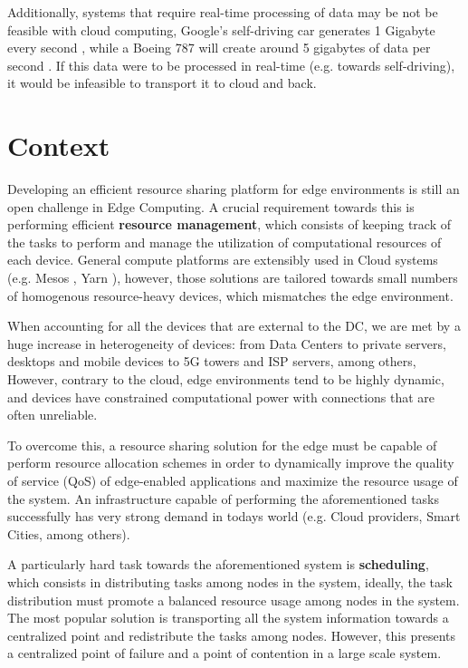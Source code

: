 Additionally, systems that require real-time processing of data may be not be feasible with cloud computing, Google's self-driving car generates 1 Gigabyte every second \cite{datafloq}, while a Boeing 787 will create around 5 gigabytes of data per second \cite{finnegan_2013}. If this data were to be processed in real-time (e.g. towards self-driving), it would be infeasible to transport it to cloud and back. 

\section{Context}

Developing an efficient resource sharing platform for edge environments is still an open challenge in Edge Computing. A crucial requirement towards this is performing efficient \textbf{resource management}, which consists of keeping track of the tasks to perform and manage the utilization of computational resources of each device. General compute platforms are extensibly used in Cloud systems (e.g. Mesos \cite{hindman2011mesos}, Yarn \cite{Vavilapalli2013ApacheHY}), however, those solutions are tailored towards small numbers of homogenous resource-heavy devices, which mismatches the edge environment.

When accounting for all the devices that are external to the DC, we are met by a huge increase in heterogeneity of devices: from Data Centers to private servers, desktops and mobile devices to 5G towers and ISP servers, among others,
However, contrary to the cloud, edge environments tend to be highly dynamic, and devices have constrained computational power with connections that are often unreliable. 

To overcome this, a resource sharing solution for the edge must be capable of perform resource allocation schemes in order to dynamically improve the quality of service (QoS) of edge-enabled applications and maximize the resource usage of the system. An infrastructure capable of performing the aforementioned tasks successfully has very strong demand in todays world (e.g. Cloud providers, Smart Cities, among others). 

A particularly hard task towards the aforementioned system is \textbf{scheduling}, which consists in distributing tasks among nodes in the system, ideally, the task distribution must promote a balanced resource usage among nodes in the system. The most popular solution is transporting all the system information towards a centralized point and redistribute the tasks among nodes. However, this presents a centralized point of failure and a point of contention in a large scale system. 

